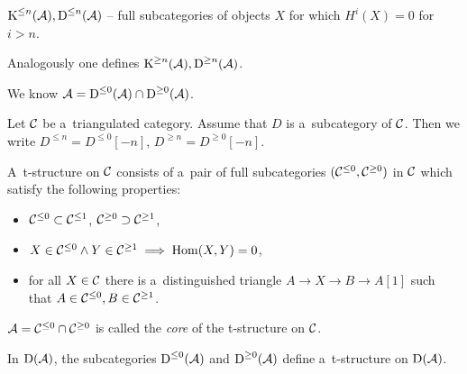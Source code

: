 



    
    \begin{definition}
        $\operatorname{K}^{\leq n}(\mathcal{A}), \operatorname{D}^{\leq n}(\mathcal{A})$ 
        -- full subcategories of objects $X$ for which $H^i(X) = 0$ for $i>n$.
        
        Analogously one defines $\operatorname{K}^{\geq n}(\mathcal{A}), \operatorname{D}^{\geq n}(\mathcal{A})$.
    \end{definition}
    We know $\mathcal{A} = \operatorname{D}^{\leq 0}(\mathcal{A}) \cap \operatorname{D}^{\geq 0}(\mathcal{A})$.
    
    \begin{definition}
        Let $\mathcal{C}$ be a~triangulated category. Assume that $D$ 
        is a~subcategory of $\mathcal{C}$. 
        Then we write $D^{\leq n} = D^{\leq 0}[-n]$,
        $D^{\geq n} = D^{\geq 0} [-n]$.
    \end{definition}
    
    \begin{definition}[t-structure]
        A~t-structure on $\mathcal{C}$ consists of a~pair of full subcategories
        $(\mathcal{C}^{\leq 0}, \mathcal{C}^{\geq 0})$ in $\mathcal{C}$ which satisfy the following properties:
        \begin{itemize}
            \item $\mathcal{C}^{\leq 0} \subset \mathcal{C}^{\leq 1}$,
            $\mathcal{C}^{\geq 0} \supset \mathcal{C}^{\geq 1}$,
            \item $X \in \mathcal{C}^{\leq 0} \wedge Y \in \mathcal{C}^{\geq 1} 
            \implies \operatorname{Hom}(X,Y) = 0$,
            \item for all $X \in \mathcal{C}$ there is a~distinguished triangle
            $A \to X \to B \to A[1]$
            such that ${A \in \mathcal{C}^{\leq 0}}, {B \in \mathcal{C}^{\geq 1}}$.
        \end{itemize}
    \end{definition}
    
    \begin{definition}[core]
        $\mathcal{A} = \mathcal{C}^{\leq 0} \cap \mathcal{C}^{\geq 0}$ is called 
        the {\em core} of the t-structure on $\mathcal{C}$.
    \end{definition}
    
    \begin{proposition}
        In $\operatorname{D}(\mathcal{A})$, the subcategories
        $\operatorname{D}^{\leq0}(\mathcal{A})$ and $\operatorname{D}^{\geq0}(\mathcal{A})$ define 
        a~t-structure on $\operatorname{D}(\mathcal{A})$.
    \end{proposition}
    
